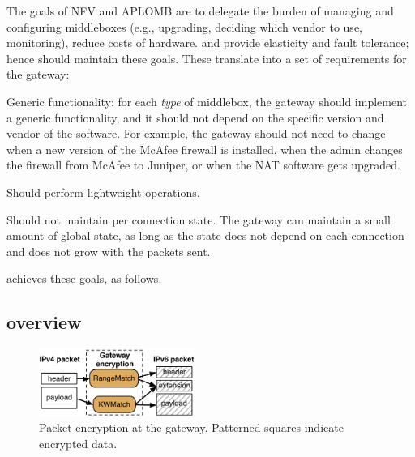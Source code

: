 The goals of NFV and APLOMB are to delegate the burden of managing and configuring
middleboxes (e.g., upgrading, deciding which vendor to use, monitoring), reduce costs of hardware. 
and provide elasticity and fault tolerance; hence \sys should maintain these goals.
%
These translate into a set of requirements for the gateway:
\begin{CompactItemize}
\item Generic functionality: for each {\em type} of middlebox, the gateway should implement a generic functionality, and it should not depend on the specific version and vendor of the software. For example, the gateway should not need to change when a new version of the McAfee firewall is installed, when the admin changes the firewall  from McAfee to Juniper, or when the NAT software gets upgraded. 
\item Should perform lightweight operations.
\item Should not maintain per connection state. The gateway can maintain a small amount of global state, as long as the state does not depend on each connection and does not grow with the packets sent.  
\end{CompactItemize}


\sys achieves these goals, as follows. 


\subsection{\sys overview}


\begin{figure}[t!]
\centering
  \includegraphics[width=2.0in]{fig/packet.pdf}
\caption{Packet encryption at the gateway. Patterned squares indicate encrypted data. \label{fig:packet}}
\end{figure}





